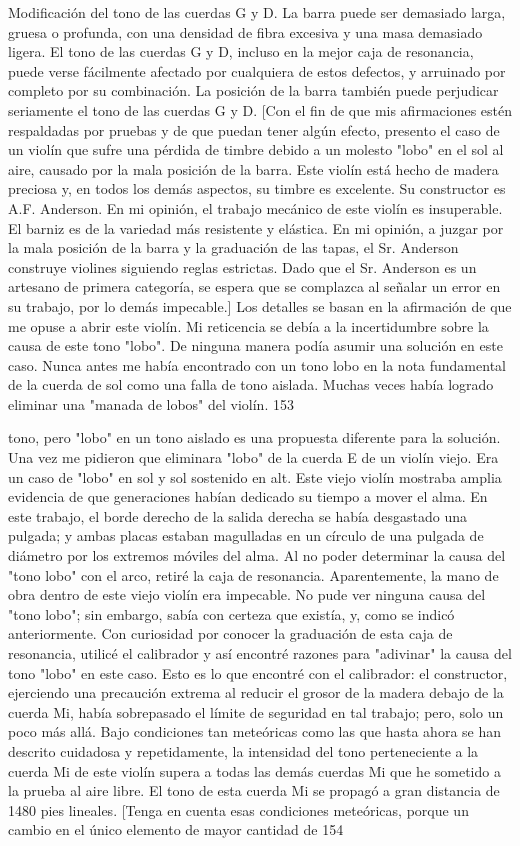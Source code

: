 Modificación del tono de las cuerdas G y D. La barra puede ser demasiado larga, gruesa o profunda, con una densidad de fibra excesiva y una masa demasiado ligera. El tono de las cuerdas G y D, incluso en la mejor caja de resonancia, puede verse fácilmente afectado por cualquiera de estos defectos, y arruinado por completo por su combinación. La posición de la barra también puede perjudicar seriamente el tono de las cuerdas G y D.
[Con el fin de que mis afirmaciones estén respaldadas por pruebas y de que puedan tener algún efecto, presento el caso de un violín que sufre una pérdida de timbre debido a un molesto "lobo" en el sol al aire, causado por la mala posición de la barra. Este violín está hecho de madera preciosa y, en todos los demás aspectos, su timbre es excelente. Su constructor es A.F. Anderson. En mi opinión, el trabajo mecánico de este violín es insuperable. El barniz es de la variedad más resistente y elástica. En mi opinión, a juzgar por la mala posición de la barra y la graduación de las tapas, el Sr. Anderson construye violines siguiendo reglas estrictas. Dado que el Sr. Anderson es un artesano de primera categoría, se espera que se complazca al señalar un error en su trabajo, por lo demás impecable.]
Los detalles se basan en la afirmación de que me opuse a abrir este violín. Mi reticencia se debía a la incertidumbre sobre la causa de este tono "lobo". De ninguna manera podía asumir una solución en este caso. Nunca antes me había encontrado con un tono lobo en la nota fundamental de la cuerda de sol como una falla de tono aislada. Muchas veces había logrado eliminar una "manada de lobos" del violín.
153

tono, pero "lobo" en un tono aislado es una propuesta diferente para la solución. Una vez me pidieron que eliminara "lobo" de la cuerda E de un violín viejo. Era un caso de "lobo" en sol y sol sostenido en alt.
Este viejo violín mostraba amplia evidencia de que generaciones habían dedicado su tiempo a mover el alma. En este trabajo, el borde derecho de la salida derecha se había desgastado una pulgada; y ambas placas estaban magulladas en un círculo de una pulgada de diámetro por los extremos móviles del alma. Al no poder determinar la causa del "tono lobo" con el arco, retiré la caja de resonancia. Aparentemente, la mano de obra dentro de este viejo violín era impecable. No pude ver ninguna causa del "tono lobo"; sin embargo, sabía con certeza que existía, y, como se indicó anteriormente. Con curiosidad por conocer la graduación de esta caja de resonancia, utilicé el calibrador y así encontré razones para "adivinar" la causa del tono "lobo" en este caso. Esto es lo que encontré con el calibrador: el constructor, ejerciendo una precaución extrema al reducir el grosor de la madera debajo de la cuerda Mi, había sobrepasado el límite de seguridad en tal trabajo; pero, solo un poco más allá. Bajo condiciones tan meteóricas como las que hasta ahora se han descrito cuidadosa y repetidamente, la intensidad del tono perteneciente a la cuerda Mi de este violín supera a todas las demás cuerdas Mi que he sometido a la prueba al aire libre. El tono de esta cuerda Mi se propagó a gran distancia de
1480 pies lineales.
[Tenga en cuenta esas condiciones meteóricas, porque un cambio en el único elemento de mayor cantidad de
154

